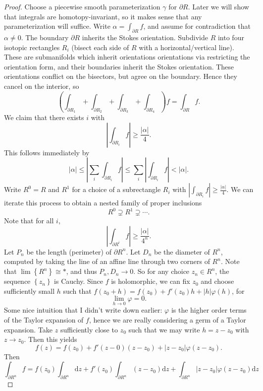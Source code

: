 \begin{proof}
	Choose a piecewise smooth parameterization $\gamma $ for $\partial R$. Later we will show that integrals are homotopy-invariant, so it makes sense that any parameterization will suffice. Write $\alpha =\int_{\partial R} f$, and assume for contradiction that $\alpha \neq 0$. The boundary $\partial R$ inherits the Stokes orientation. Subdivide $R$ into four isotopic rectangles $R_i$ (bisect each side of $R$ with a horizontal/vertical line). These are submanifolds which inherit orientations orientations via restricting the orientation form, and their boundaries inherit the Stokes orientation. These orientations conflict on the bisectors, but agree on the boundary. Hence they cancel on the interior, so
	\[
		\left( \int_{\partial R_1} + \int_{\partial R_2} + \int_{\partial R_3} + \int_{\partial R_4} \right) f=\int_{\partial R} f
	.\]
	We claim that there exists $i$ with
	\[
		\left| \int_{\partial R_i} f \right| \geq \frac{\left| \alpha  \right| }{4} 
	.\]
	This follows immediately by
	\[
		\left| \alpha  \right| \leq \left| \sum_{i} \int_{\partial R_i} f \right| \leq \sum_{i} \left| \int_{\partial R_i} f \right| < \left| \alpha  \right| 
	.\]
	Write $R^0=R$ and $R^1$ for a choice of a subrectangle $R_i$ with $\left|\int_{\partial R_i} f\right| \geq \frac{\left| \alpha  \right| }{4} $. We can iterate this process to obtain a nested family of proper inclusions
	\[
		R^0 \supsetneq R^1 \supsetneq \cdots
	.\]
	Note that for all $i$,
	\[
		\left| \int_{\partial R^i} f \right| \geq \frac{\left| \alpha  \right| }{4^n} 
	.\]
	Let $P_n$ be the length (perimeter) of $\partial R^n$. Let $D_n$ be the diameter of $R^n$, computed by taking the line of an affine line through two corners of $R^n$. Note that $\lim \left\{ R^n \right\} \cong *$, and thus $P_n,D_n\to 0$. So for any choice $z_n\in R^n$, the sequence $\left\{ z_n \right\} $ is Cauchy. Since $f$ is holomorphic, we can fix $z_0$ and choose sufficiently small $h$ such that $f(z_0+h)=f(z_0)+f'(z_0)h+\left| h \right| \varphi (h)$, for
	\[
		\lim_{h\to 0} \varphi =0
	.\]
	Some nice intuition that I didn't write down earlier: $\varphi $ is the higher order terms of the Taylor expansion of $f$, hence we are really considering a germ of a Taylor expansion. Take $z$ sufficiently close to $z_0$ such that we may write $h=z-z_0$ with $z\to z_0$. Then this yields
	\[
		f(z)=f(z_0)+f'(z-0)(z-z_0)+\left| z-z_0 \right| \varphi (z-z_0)
	.\]
	Then
	\[
		\int_{\partial R^n} f=f(z_0)\int_{\partial R^n} \mathrm{d} z + f'(z_0)\int_{\partial R^n} (z-z_0)\mathrm{d} z + \int_{\partial R^n} \left| z-z_0 \right| \varphi (z-z_0)\mathrm{d} z
\]
\end{proof}
